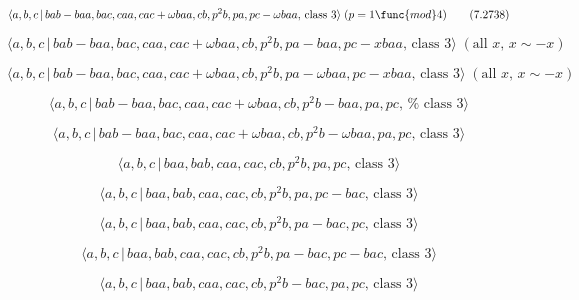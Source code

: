 \documentclass[10pt]{article}
\begin{document}
\begin{equation}
\langle a,b,c\,|\,bab-baa,bac,caa,cac+\omega baa,cb,p^{2}b,pa,pc-\omega
baa,\,\text{class }3\rangle \;(p=1\func{mod}4)  \tag{7.2738}
\end{equation}

\begin{equation}
\langle a,b,c\,|\,bab-baa,bac,caa,cac+\omega baa,cb,p^{2}b,pa-baa,pc-xbaa,\,%
\text{class }3\rangle \;(\text{all }x,\,x\sim -x)  \tag{7.2739}
\end{equation}

\begin{equation}
\langle a,b,c\,|\,bab-baa,bac,caa,cac+\omega baa,cb,p^{2}b,pa-\omega
baa,pc-xbaa,\,\text{class }3\rangle \;(\text{all }x,\,x\sim -x)  \tag{7.2740}
\end{equation}

\begin{equation}
\langle a,b,c\,|\,bab-baa,bac,caa,cac+\omega baa,cb,p^{2}b-baa,pa,pc,\,\text{%
class }3\rangle  \tag{7.2741}
\end{equation}

\begin{equation}
\langle a,b,c\,|\,bab-baa,bac,caa,cac+\omega baa,cb,p^{2}b-\omega
baa,pa,pc,\,\text{class }3\rangle  \tag{7.2742}
\end{equation}

\begin{equation}
\langle a,b,c\,|\,baa,bab,caa,cac,cb,p^2b,pa,pc,\,\text{class }3\rangle 
\tag{7.2743}
\end{equation}

\begin{equation}
\langle a,b,c\,|\,baa,bab,caa,cac,cb,p^2b,pa,pc-bac,\,\text{class }3\rangle 
\tag{7.2744}
\end{equation}

\begin{equation}
\langle a,b,c\,|\,baa,bab,caa,cac,cb,p^2b,pa-bac,pc,\,\text{class }3\rangle 
\tag{7.2745}
\end{equation}

\begin{equation}
\langle a,b,c\,|\,baa,bab,caa,cac,cb,p^2b,pa-bac,pc-bac,\,\text{class }%
3\rangle  \tag{7.2746}
\end{equation}

\begin{equation}
\langle a,b,c\,|\,baa,bab,caa,cac,cb,p^2b-bac,pa,pc,\,\text{class }3\rangle 
\tag{7.2747}
\end{equation}
\end{document}
